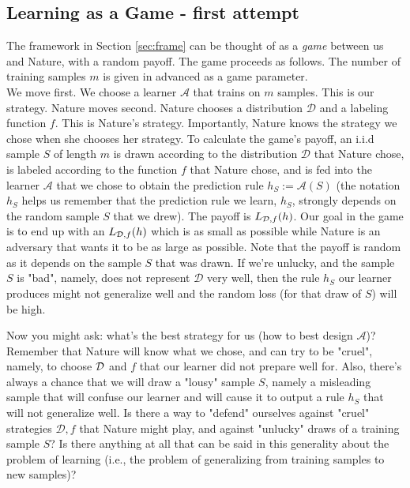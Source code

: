 {\subsection{Learning as a Game - first attempt}

The framework in Section \ref{sec:frame} can be thought of as a \textit{game} between us and Nature, with a random payoff. The game proceeds as follows. The number of training samples $m$ is given in advanced as a game parameter. \\

We move first. We choose a learner $\mathcal{A}$ that trains on $m$ samples. This is our strategy.
Nature moves second. Nature chooses a distribution $\mathcal{D}$ and a labeling function $f$. This is Nature's strategy. Importantly, Nature knows the strategy we chose when she chooses her strategy.
To calculate the game's payoff, an i.i.d sample $S$ of length $m$ is drawn according to the distribution $\mathcal{D}$ that Nature chose, is labeled according to the function $f$ that Nature chose, and is fed into the learner $\mathcal{A}$ that we chose to obtain the prediction rule $h_S:=\mathcal{A}(S)$ (the notation $h_S$ helps us remember that the prediction rule we learn, $h_S$, strongly depends on the random sample $S$ that we drew). The payoff is $L_{\mathcal{D},f}(h)$. Our goal in the game is to end up with an $L_{\mathcal{D},f}(h)$ which is as small as possible while Nature is an adversary that wants it to be as large as possible. Note that the payoff is random as it depends on the sample $S$ that was drawn. If we're unlucky, and the sample $S$ is "bad", namely, does not represent $\mathcal{D}$ very well, then the rule $h_S$ our learner produces might not generalize well and the random loss (for that draw of $S$) will be high. 

Now you might ask: what's the best strategy for us (how to best design $\mathcal{A}$)? 
Remember that Nature will know what we chose, and can try to be "cruel", namely, to choose $\mathcal{D}$ and $f$ that our learner did not prepare well for. Also, there's always a chance that we will draw a "lousy" sample $S$, namely a misleading sample that will confuse our learner and will cause it to output a rule $h_S$ that will not generalize well. Is there a way to "defend" ourselves against "cruel" strategies $\mathcal{D},f$ that Nature might play, and against "unlucky" draws of a training sample $S$? Is there anything at all that can be said in this generality about the problem of learning (i.e., the problem of generalizing from training samples to new samples)? 

}
